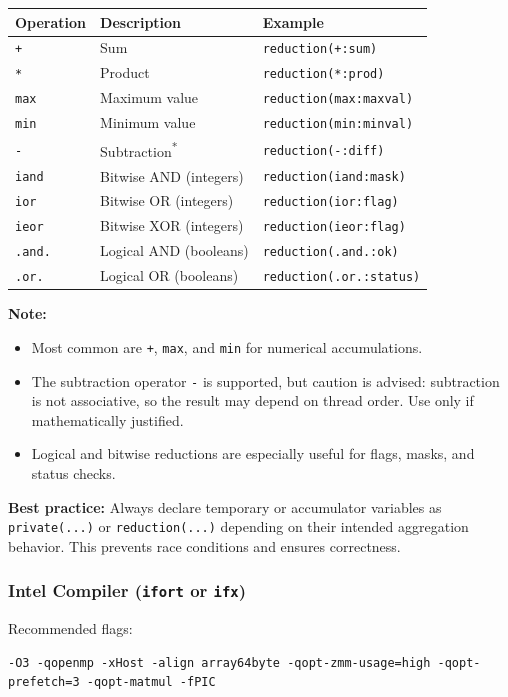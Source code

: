 \documentclass{article}
\begin{document}
\begin{center}
\begin{tabular}{|l|l|l|}
\hline
\textbf{Operation} & \textbf{Description} & \textbf{Example} \\
\hline
\texttt{+} & Sum & \texttt{reduction(+:sum)} \\
\texttt{*} & Product & \texttt{reduction(*:prod)} \\
\texttt{max} & Maximum value & \texttt{reduction(max:maxval)} \\
\texttt{min} & Minimum value & \texttt{reduction(min:minval)} \\
\texttt{-} & Subtraction\textsuperscript{*} & \texttt{reduction(-:diff)} \\
\hline
\texttt{iand} & Bitwise AND (integers) & \texttt{reduction(iand:mask)} \\
\texttt{ior} & Bitwise OR (integers) & \texttt{reduction(ior:flag)} \\
\texttt{ieor} & Bitwise XOR (integers) & \texttt{reduction(ieor:flag)} \\
\hline
\texttt{.and.} & Logical AND (booleans) & \texttt{reduction(.and.:ok)} \\
\texttt{.or.} & Logical OR (booleans) & \texttt{reduction(.or.:status)} \\
\hline
\end{tabular}
\end{center}

\vspace{1em}
\noindent
\textbf{Note:}
\begin{itemize}
\item Most common are \texttt{+}, \texttt{max}, and \texttt{min} for numerical accumulations.
\item The subtraction operator \texttt{-} is supported, but caution is advised: subtraction is not associative, so the result may depend on thread order. Use only if mathematically justified.
\item Logical and bitwise reductions are especially useful for flags, masks, and status checks.
\end{itemize}

\noindent
\textbf{Best practice:} Always declare temporary or accumulator variables as \texttt{private(...)} or \texttt{reduction(...)} depending on their intended aggregation behavior. This prevents race conditions and ensures correctness.

\subsubsection{Intel Compiler (\texttt{ifort} or \texttt{ifx})}
\label{intel_flags}
Recommended flags:
\begin{verbatim}
-O3 -qopenmp -xHost -align array64byte -qopt-zmm-usage=high -qopt-prefetch=3 -qopt-matmul -fPIC
\end{verbatim}
\end{document}

